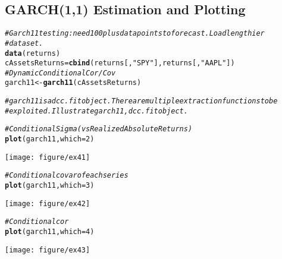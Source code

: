 \documentclass[a4paper]{article}\usepackage[]{graphicx}\usepackage[]{color}
\makeatletter
\def\maxwidth{ %
  \ifdim\Gin@nat@width>\linewidth
    \linewidth
  \else
    \Gin@nat@width
  \fi
}
\newcommand{\hlnum}[1]{\textcolor[rgb]{0.686,0.059,0.569}{#1}}%
\newcommand{\hlstr}[1]{\textcolor[rgb]{0.192,0.494,0.8}{#1}}%
\newcommand{\hlcom}[1]{\textcolor[rgb]{0.678,0.584,0.686}{\textit{#1}}}%
\newcommand{\hlstd}[1]{\textcolor[rgb]{0.345,0.345,0.345}{#1}}%
\newcommand{\hlkwb}[1]{\textcolor[rgb]{0.69,0.353,0.396}{#1}}%
\newcommand{\hlkwc}[1]{\textcolor[rgb]{0.333,0.667,0.333}{#1}}%
\newcommand{\hlkwd}[1]{\textcolor[rgb]{0.737,0.353,0.396}{\textbf{#1}}}%
\newenvironment{kframe}{%
 \def\at@end@of@kframe{}%
 \ifinner\ifhmode%
  \def\at@end@of@kframe{\end{minipage}}%
  \begin{minipage}{\columnwidth}%
 \fi\fi%
 \def\FrameCommand##1{\hskip\@totalleftmargin \hskip-\fboxsep
 \colorbox{shadecolor}{##1}\hskip-\fboxsep
     \hskip-\linewidth \hskip-\@totalleftmargin \hskip\columnwidth}%
 \MakeFramed {\advance\hsize-\width
   \@totalleftmargin\z@ \linewidth\hsize
   \@setminipage}}%
 {\par\unskip\endMakeFramed%
 \at@end@of@kframe}
\newenvironment{knitrout}{}{} %
\makeatother
\begin{document}
\subsection{GARCH(1,1) Estimation and Plotting}
\begin{knitrout}
\color{fgcolor}\begin{kframe}
\begin{alltt}
\hlcom{# Garch11 testing: need 100 plus data points to forecast.  Load lengthier}
\hlcom{# dataset.}
\hlkwd{data}\hlstd{(returns)}
\hlstd{cAssetsReturns} \hlkwb{=} \hlkwd{cbind}\hlstd{(returns[,} \hlstr{"SPY"}\hlstd{], returns[,} \hlstr{"AAPL"}\hlstd{])}
\hlcom{# Dynamic Conditional Cor/Cov}
\hlstd{garch11} \hlkwb{<-} \hlkwd{garch11}\hlstd{(cAssetsReturns)}

\hlcom{# garch11 is a dcc.fit object. There are multiple extraction functions to be}
\hlcom{# exploited.  Illustrate garch11, dcc.fit object.}

\hlcom{# Conditional Sigma (vs Realized Absolute Returns)}
\hlkwd{plot}\hlstd{(garch11,} \hlkwc{which} \hlstd{=} \hlnum{2}\hlstd{)}
\end{alltt}
\end{kframe}
\texttt{[image: figure/ex41]} 
\begin{kframe}\begin{alltt}
\hlcom{# Conditional covar of each series}
\hlkwd{plot}\hlstd{(garch11,} \hlkwc{which} \hlstd{=} \hlnum{3}\hlstd{)}
\end{alltt}
\end{kframe}
\texttt{[image: figure/ex42]} 
\begin{kframe}\begin{alltt}
\hlcom{# Conditional cor}
\hlkwd{plot}\hlstd{(garch11,} \hlkwc{which} \hlstd{=} \hlnum{4}\hlstd{)}
\end{alltt}
\end{kframe}
\texttt{[image: figure/ex43]} 

\end{knitrout}
\end{document}
